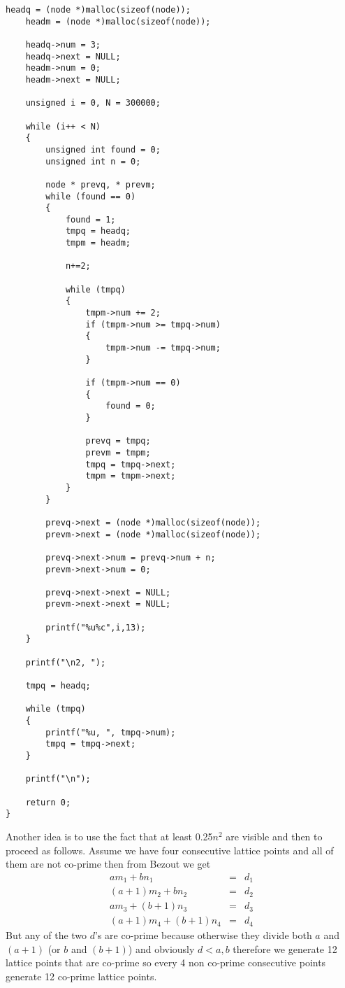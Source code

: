 \documentclass[aps,preprint,preprintnumbers,nofootinbib,showpacs,prd]{revtex4-1}
\newcommand{\nbea}{\begin{eqnarray*}}
\newcommand{\neea}{\end{eqnarray*}}
\begin{document}
\begin{enumerate}
\begin{Verbatim}[baselinestretch=0.75]
    headq = (node *)malloc(sizeof(node));
    headm = (node *)malloc(sizeof(node));
    
    headq->num = 3;
    headq->next = NULL;
    headm->num = 0;
    headm->next = NULL;
    
    unsigned i = 0, N = 300000;
    
    while (i++ < N)
    {
        unsigned int found = 0;
        unsigned int n = 0;
        
        node * prevq, * prevm;
        while (found == 0)
        {
            found = 1;
            tmpq = headq;
            tmpm = headm;
            
            n+=2; 
            
            while (tmpq)
            {
                tmpm->num += 2;
                if (tmpm->num >= tmpq->num)
                {
                    tmpm->num -= tmpq->num;
                }
                
                if (tmpm->num == 0)
                {
                    found = 0;
                }
                
                prevq = tmpq;
                prevm = tmpm;
                tmpq = tmpq->next;
                tmpm = tmpm->next;
            }
        }
        
        prevq->next = (node *)malloc(sizeof(node));
        prevm->next = (node *)malloc(sizeof(node));
        
        prevq->next->num = prevq->num + n;
        prevm->next->num = 0;
        
        prevq->next->next = NULL;
        prevm->next->next = NULL; 

        printf("%u%c",i,13);
    }
    
    printf("\n2, ");    
    
    tmpq = headq;
    
    while (tmpq)
    {
        printf("%u, ", tmpq->num);
        tmpq = tmpq->next;
    }
    
    printf("\n");
    
    return 0;
}
\end{Verbatim}
%





Another idea is to use the fact that at least 0.25$n^2$ are visible and then to proceed as follows. Assume we have four consecutive lattice points and all of them are not co-prime then from Bezout we get
%
\nbea
am_1 + bn_1 & = & d_1 \\
(a + 1)m_2 + bn_2 & = & d_2 \\
am_3 + (b + 1)n_3 & = & d_3 \\
(a + 1)m_4 + (b + 1)n_4 & = & d_4
\neea
%
But any of the two $d$'s are co-prime because otherwise they divide both $a$ and $(a + 1)$ (or $b$ and $(b + 1)$) and obviously $d < a,b$ therefore we generate 12 lattice points that are co-prime so every 4 non co-prime consecutive points generate 12 co-prime lattice points.


\end{enumerate}
\end{document}
